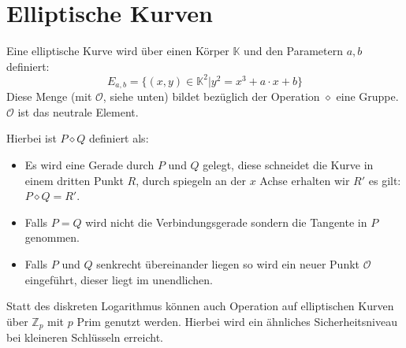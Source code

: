 \chapter{Elliptische Kurven}
Eine elliptische Kurve wird über einen Körper $\mathbb{K}$ und den Parametern
$a, b$ definiert:
\begin{equation}
    E_{a, b} = \{(x, y) \in \mathbb{K}^2 | y^2 = x^3 + a \cdot x + b\}
\end{equation}
Diese Menge (mit $\mathcal{O}$, siehe unten) bildet bezüglich der Operation 
$\diamond$ eine Gruppe. $\mathcal{O}$ ist das neutrale Element.

Hierbei ist $P \diamond Q$ definiert als:
\begin{itemize}
    \item Es wird eine Gerade durch $P$ und $Q$ gelegt, diese schneidet die Kurve in
        einem dritten Punkt $R$, durch spiegeln an der $x$ Achse erhalten wir $R'$
        es gilt: $P \diamond Q = R'$.
    \item Falls $P=Q$ wird nicht die Verbindungsgerade sondern die Tangente in $P$
        genommen.
    \item Falls $P$ und $Q$ senkrecht übereinander liegen so wird ein neuer Punkt
        $\mathcal{O}$ eingeführt, dieser liegt im unendlichen.
\end{itemize}


Statt des diskreten Logarithmus können auch Operation auf elliptischen Kurven über
$\mathbb{Z}_p$ mit $p$ Prim genutzt werden. Hierbei wird ein ähnliches Sicherheitsniveau
bei kleineren Schlüsseln erreicht.
